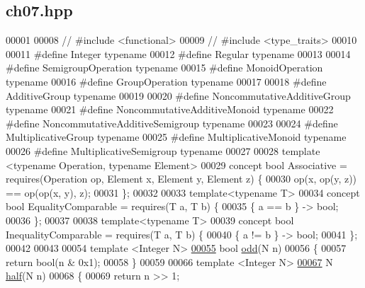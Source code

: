 \hypertarget{ch07_8hpp_source}{}\subsection{ch07.\+hpp}

\begin{DoxyCode}
00001 
00008 \textcolor{comment}{// #include <functional>}
00009 \textcolor{comment}{// #include <type\_traits>}
00010 
00011 \textcolor{preprocessor}{#define Integer typename}
00012 \textcolor{preprocessor}{#define Regular typename}
00013 
00014 \textcolor{preprocessor}{#define SemigroupOperation typename}
00015 \textcolor{preprocessor}{#define MonoidOperation typename}
00016 \textcolor{preprocessor}{#define GroupOperation typename}
00017 
00018 \textcolor{preprocessor}{#define AdditiveGroup typename}
00019 
00020 \textcolor{preprocessor}{#define NoncommutativeAdditiveGroup typename}
00021 \textcolor{preprocessor}{#define NoncommutativeAdditiveMonoid typename}
00022 \textcolor{preprocessor}{#define NoncommutativeAdditiveSemigroup typename}
00023 
00024 \textcolor{preprocessor}{#define MultiplicativeGroup typename}
00025 \textcolor{preprocessor}{#define MultiplicativeMonoid typename}
00026 \textcolor{preprocessor}{#define MultiplicativeSemigroup typename}
00027 
00028 \textcolor{keyword}{template} <\textcolor{keyword}{typename} Operation, \textcolor{keyword}{typename} Element>
00029 concept \textcolor{keywordtype}{bool} Associative = requires(Operation op, Element x, Element y, Element z) \{
00030   op(x, op(y, z)) == op(op(x, y), z);
00031 \};
00032 
00033 \textcolor{keyword}{template}<\textcolor{keyword}{typename} T>
00034 concept \textcolor{keywordtype}{bool} EqualityComparable = requires(T a, T b) \{
00035   \{ a == b \} -> bool;
00036 \};
00037 
00038 \textcolor{keyword}{template}<\textcolor{keyword}{typename} T>
00039 concept \textcolor{keywordtype}{bool} InequalityComparable = requires(T a, T b) \{
00040   \{ a != b \} -> bool;
00041 \};
00042 
00043 
00054 \textcolor{keyword}{template} <Integer N>
\mbox{\hyperlink{ch07_8hpp_a77588a29d6eeebc52834d05039b7f83f}{00055}} \textcolor{keywordtype}{bool} \mbox{\hyperlink{ch07_8hpp_a77588a29d6eeebc52834d05039b7f83f}{odd}}(N n)
00056 \{
00057   \textcolor{keywordflow}{return} bool(n & 0x1);
00058 \}
00059 
00066 \textcolor{keyword}{template} <Integer N>
\mbox{\hyperlink{ch07_8hpp_a5c310c077a590421ce629a0a40d6b841}{00067}} N \mbox{\hyperlink{ch07_8hpp_a5c310c077a590421ce629a0a40d6b841}{half}}(N n)
00068 \{
00069   \textcolor{keywordflow}{return} n >> 1;

\end{DoxyCode}
